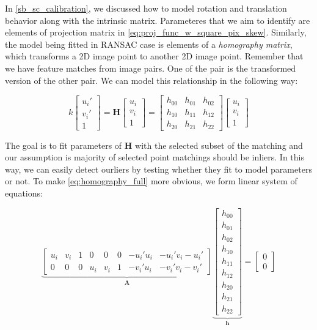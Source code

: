 \documentclass[a4paper]{report}
\numberwithin{figure}{section}
\begin{document}
In \ref{sb_sc_calibration}, we discussed how to model rotation and translation 
behavior along with the intrinsic matrix. Parameteres that we aim to 
identify are elements of projection matrix in \ref{eq:proj_func_w_square_pix_skew}. 
Similarly, the model being fitted in RANSAC case is elements of a 
\textit{homography matrix}, 
which transforms a 2D image point to another 2D image point.
Remember that we have feature matches from image pairs. One of the pair is 
the transformed version of the other pair. 
We can model this relationship in the following way:

\begin{equation}
  k
  \begin{bmatrix}
    u_i' \\ v_i' \\1
  \end{bmatrix}
  =
  \mathbf{H}
  \begin{bmatrix}
    u_i \\ v_i \\1
  \end{bmatrix}
  =
  \begin{bmatrix}
    h_{00} & h_{01} & h_{02} \\
    h_{10} & h_{11} & h_{12} \\
    h_{20} & h_{21} & h_{22}
    \end{bmatrix}
  \begin{bmatrix}
      u_i \\ v_i \\1
    \end{bmatrix}
  \end{equation}\label{eq:homography_full}

The goal is to fit parameters of $\mathbf{H}$ with the selected subset of 
the matching and our assumption is majority of selected point matchings 
should be inliers. In this way, we can easily detect ourliers by testing 
whether they fit to model parameters or not. To make \ref{eq:homography_full} 
more obvious, we form linear system of equations:

\begin{equation}
\underbrace{
\begin{bmatrix}
  u_i & v_i & 1 & 0 & 0 & 0 & -u_i'u_i & -u_i'v_i -u_i'\\
  0 & 0 & 0 & u_i & v_i & 1 & -v_i'u_i & -v_i'v_i -v_i'
\end{bmatrix}}_{\mathbf{A}}
\underbrace{
\begin{bmatrix}
    h_{00} \\ h_{01} \\ h_{02} \\ h_{10} \\ h_{11} \\ h_{12} \\ h_{20} \\ h_{21} \\ h_{22}
\end{bmatrix}}_{\mathbf{h}}
= 
\begin{bmatrix}
  0\\0
\end{bmatrix}
\end{equation}
\end{document}
